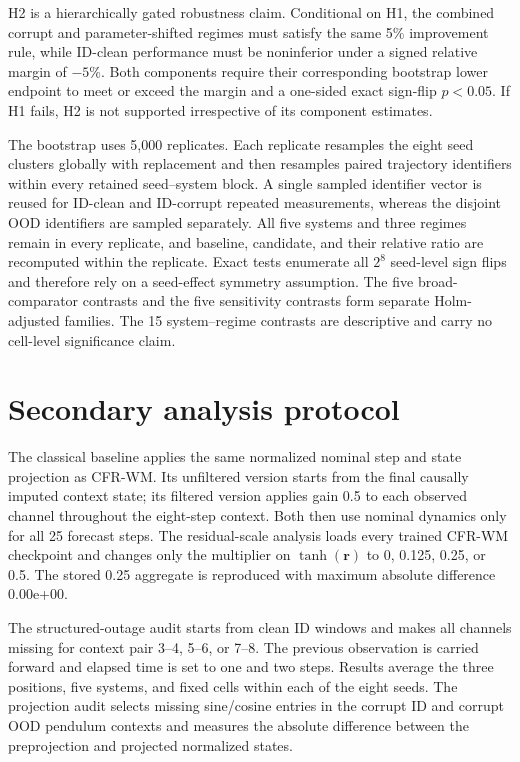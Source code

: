 \documentclass[iicol,pdflatex,sn-basic,Numbered]{sn-jnl}
\newcommand{\vect}[1]{\mathbf{#1}}
\newcommand{\ResidualReconstructionDifference}{0.00e+00}
\begin{document}
\begin{appendices}
H2 is a hierarchically gated robustness claim. Conditional on H1, the combined corrupt and parameter-shifted regimes must satisfy the same 5\% improvement rule, while ID-clean performance must be noninferior under a signed relative margin of $-5\%$. Both components require their corresponding bootstrap lower endpoint to meet or exceed the margin and a one-sided exact sign-flip $p<0.05$. If H1 fails, H2 is not supported irrespective of its component estimates.

The bootstrap uses 5,000 replicates. Each replicate resamples the eight seed clusters globally with replacement and then resamples paired trajectory identifiers within every retained seed--system block. A single sampled identifier vector is reused for ID-clean and ID-corrupt repeated measurements, whereas the disjoint OOD identifiers are sampled separately. All five systems and three regimes remain in every replicate, and baseline, candidate, and their relative ratio are recomputed within the replicate. Exact tests enumerate all $2^8$ seed-level sign flips and therefore rely on a seed-effect symmetry assumption. The five broad-comparator contrasts and the five sensitivity contrasts form separate Holm-adjusted families. The 15 system--regime contrasts are descriptive and carry no cell-level significance claim.

\section{Secondary analysis protocol}

The classical baseline applies the same normalized nominal step and state
projection as CFR-WM. Its unfiltered version starts from the final causally
imputed context state; its filtered version applies gain 0.5 to each observed
channel throughout the eight-step context. Both then use nominal dynamics only
for all 25 forecast steps. The residual-scale analysis loads every trained CFR-WM
checkpoint and changes only the multiplier on $\tanh(\vect r)$ to 0, 0.125,
0.25, or 0.5. The stored 0.25 aggregate is reproduced with maximum absolute
difference \ResidualReconstructionDifference{}.

The structured-outage audit starts from clean ID windows and makes all channels
missing for context pair 3--4, 5--6, or 7--8. The previous observation is
carried forward and elapsed time is set to one and two steps. Results average
the three positions, five systems, and fixed cells within each of the eight
seeds. The projection audit selects missing sine/cosine entries in the corrupt
ID and corrupt OOD pendulum contexts and measures the absolute difference
between the preprojection and projected normalized states.


\end{appendices}
\end{document}
